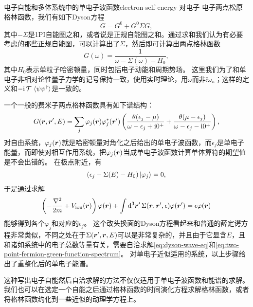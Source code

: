 \begin{back}{电子自能和多体系统中的单电子波函数}{electron-self-energy}
    对电子-电子两点松原格林函数，我们有如下Dyson方程
    \begin{equation}
        G  = G^{0} + G^0 \Sigma G,
    \end{equation}
    其中$-\Sigma$是1PI自能图之和，或者说是正规自能图之和。通过求和我们认为有必要考虑的那些正规自能图，可以计算出了$\Sigma$，然后即可计算出两点格林函数
    \[
        G(\omega) = \frac{1}{\omega - \Sigma(\omega) - H_0},
    \]
    其中$H_0$表示单粒子哈密顿量，同时包括电子动能和周期势场。
    这里我们为了和单电子非相对论性量子力学的记号保持一致，使用实时理论，用$\omega$而非$\ii \omega_n$；这样的定义和$- \mathrm{i} \operatorname{\mathcal{T}} \expval*{\psi \psi^\dagger}$是一致的。

    一个一般的费米子两点格林函数具有如下谱结构：
    \begin{equation}
        G(\vb*{r}, \vb*{r}', E) = \sum_{j} \varphi_j(\vb*{r}) \varphi_j^*(\vb*{r}') \left( \frac{\theta(\epsilon_j - \mu)}{\omega - \epsilon_j + \mathrm{i} 0^+} + \frac{\theta(\mu - \epsilon_j)}{\omega - \epsilon_j - \mathrm{i} 0^+} \right),
        \label{eq:two-point-fermion-green-function-spectrum}
    \end{equation}
    对自由系统，$\varphi_j(\vb*{r})$就是哈密顿量对角化之后给出的单电子波函数，而$\epsilon_j$是单电子能量，而即使对相互作用系统，把$\varphi_j(\vb*{r})$当成单电子波函数计算单体算符的期望值是不会出错的。
    在极点附近，有
    \[
        (\epsilon_j - \Sigma(E) - H_0) \ket{\varphi_j} = 0, 
    \]
    于是通过求解
    \begin{equation}
        \left( - \frac{\laplacian}{2m} + V_\text{ion}(\vb*{r}) \right) \varphi(\vb*{r}) + \int \dd[3]{\vb*{r}'} \Sigma(\vb*{r}, \vb*{r}', \epsilon) \varphi(\vb*{r}') = \epsilon \varphi(\vb*{r})
        \label{eq:dyson-wave-eq}
    \end{equation}
    能够得到各个$\varphi_j$和对应的$\epsilon_j$。
    这个改头换面的Dyson方程看起来和普通的薛定谔方程非常类似，不同之处在于$\Sigma(\vb*{r}', \vb*{r}, E)$可以是非常复杂的，并且由于它显含$E$，且和诸如系统中的电子总数等量有关，需要自洽求解\eqref{eq:dyson-wave-eq}和\eqref{eq:two-point-fermion-green-function-spectrum}。
    对单电子近似适用的系统，以上步骤给出了重整化后的单电子能谱。

    这种写出电子自能然后自洽求解的方法不仅仅适用于单电子波函数和能谱的求解。
    我们也可以在选定一个自能之后通过格林函数的时间演化方程求解格林函数，或者将格林函数约化到一些近似的动理学方程上。
\end{back}

